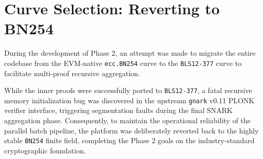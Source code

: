 \section{Curve Selection: Reverting to BN254}
During the development of Phase 2, an attempt was made to migrate the entire codebase from the EVM-native \texttt{ecc.BN254} curve to the \texttt{BLS12-377} curve to facilitate multi-proof recursive aggregation.

While the inner proofs were successfully ported to \texttt{BLS12-377}, a fatal recursive memory initialization bug was discovered in the upstream \texttt{gnark} v0.11 PLONK verifier interface, triggering segmentation faults during the final SNARK aggregation phase. Consequently, to maintain the operational reliability of the parallel batch pipeline, the platform was deliberately reverted back to the highly stable \texttt{BN254} finite field, completing the Phase 2 goals on the industry-standard cryptographic foundation.
